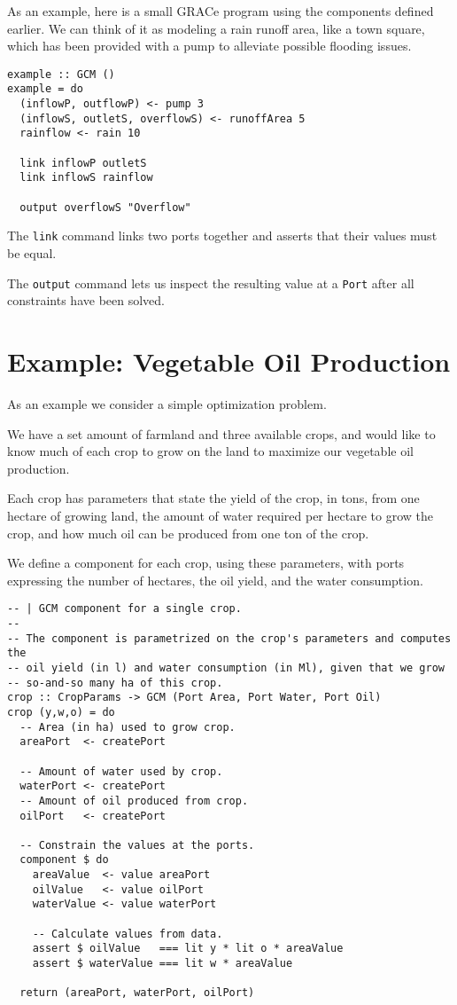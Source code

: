 \documentclass[a4paper]{article}
\begin{document}
As an example, here is a small GRACe program using the components defined
earlier. We can think of it as modeling a rain runoff area, like a
town square, which has been provided with a pump to alleviate possible
flooding issues.
%
\begin{verbatim}
example :: GCM ()
example = do
  (inflowP, outflowP) <- pump 3
  (inflowS, outletS, overflowS) <- runoffArea 5
  rainflow <- rain 10

  link inflowP outletS
  link inflowS rainflow

  output overflowS "Overflow"
\end{verbatim}
The \texttt{link} command links two ports together and asserts that their values
must be equal.

The \texttt{output} command lets us inspect the resulting value at a \texttt{Port}
after all constraints have been solved.

\section{Example: Vegetable Oil Production}
As an example we consider a simple optimization problem.

We have a set amount of farmland and three available crops, and would like to
know much of each crop to grow on the land to maximize our vegetable oil
production.

Each crop has parameters that state the yield of the crop, in tons, from one hectare of
growing land, the amount of water required per hectare to grow the crop, and how
much oil can be produced from one ton of the crop.

We define a component for each crop, using these parameters, with ports
expressing the number of hectares, the oil yield, and the water consumption.

\begin{verbatim}
-- | GCM component for a single crop.
--
-- The component is parametrized on the crop's parameters and computes the
-- oil yield (in l) and water consumption (in Ml), given that we grow
-- so-and-so many ha of this crop.
crop :: CropParams -> GCM (Port Area, Port Water, Port Oil)
crop (y,w,o) = do
  -- Area (in ha) used to grow crop.
  areaPort  <- createPort

  -- Amount of water used by crop.
  waterPort <- createPort
  -- Amount of oil produced from crop.
  oilPort   <- createPort

  -- Constrain the values at the ports.
  component $ do
    areaValue  <- value areaPort
    oilValue   <- value oilPort
    waterValue <- value waterPort

    -- Calculate values from data.
    assert $ oilValue   === lit y * lit o * areaValue
    assert $ waterValue === lit w * areaValue

  return (areaPort, waterPort, oilPort)
\end{verbatim}
\end{document}
